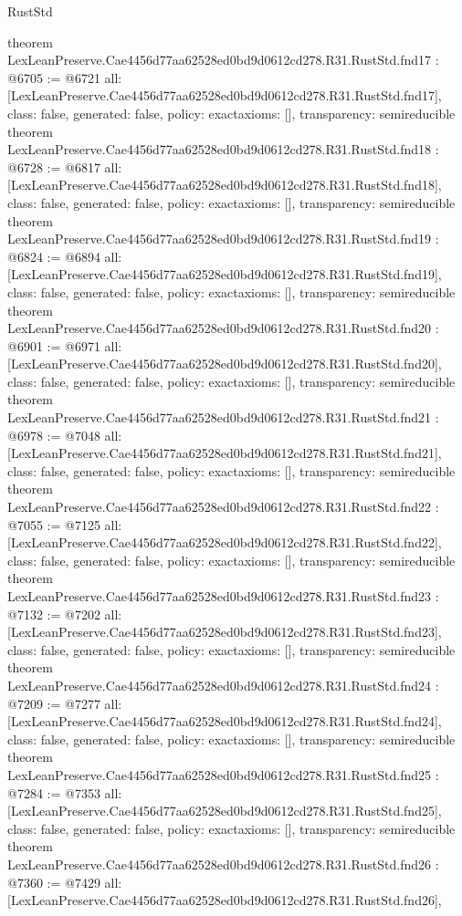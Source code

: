 \begin{lexlean}{RustStd}
\begin{coremodule}
theorem LexLeanPreserve.Cae4456d77aa62528ed0bd9d0612cd278.R31.RustStd.fnd17 : @6705 := @6721 {
  all: [LexLeanPreserve.Cae4456d77aa62528ed0bd9d0612cd278.R31.RustStd.fnd17],
  class: false,
  generated: false,
  policy: exact{axioms: []},
  transparency: semireducible
}
theorem LexLeanPreserve.Cae4456d77aa62528ed0bd9d0612cd278.R31.RustStd.fnd18 : @6728 := @6817 {
  all: [LexLeanPreserve.Cae4456d77aa62528ed0bd9d0612cd278.R31.RustStd.fnd18],
  class: false,
  generated: false,
  policy: exact{axioms: []},
  transparency: semireducible
}
theorem LexLeanPreserve.Cae4456d77aa62528ed0bd9d0612cd278.R31.RustStd.fnd19 : @6824 := @6894 {
  all: [LexLeanPreserve.Cae4456d77aa62528ed0bd9d0612cd278.R31.RustStd.fnd19],
  class: false,
  generated: false,
  policy: exact{axioms: []},
  transparency: semireducible
}
theorem LexLeanPreserve.Cae4456d77aa62528ed0bd9d0612cd278.R31.RustStd.fnd20 : @6901 := @6971 {
  all: [LexLeanPreserve.Cae4456d77aa62528ed0bd9d0612cd278.R31.RustStd.fnd20],
  class: false,
  generated: false,
  policy: exact{axioms: []},
  transparency: semireducible
}
theorem LexLeanPreserve.Cae4456d77aa62528ed0bd9d0612cd278.R31.RustStd.fnd21 : @6978 := @7048 {
  all: [LexLeanPreserve.Cae4456d77aa62528ed0bd9d0612cd278.R31.RustStd.fnd21],
  class: false,
  generated: false,
  policy: exact{axioms: []},
  transparency: semireducible
}
theorem LexLeanPreserve.Cae4456d77aa62528ed0bd9d0612cd278.R31.RustStd.fnd22 : @7055 := @7125 {
  all: [LexLeanPreserve.Cae4456d77aa62528ed0bd9d0612cd278.R31.RustStd.fnd22],
  class: false,
  generated: false,
  policy: exact{axioms: []},
  transparency: semireducible
}
theorem LexLeanPreserve.Cae4456d77aa62528ed0bd9d0612cd278.R31.RustStd.fnd23 : @7132 := @7202 {
  all: [LexLeanPreserve.Cae4456d77aa62528ed0bd9d0612cd278.R31.RustStd.fnd23],
  class: false,
  generated: false,
  policy: exact{axioms: []},
  transparency: semireducible
}
theorem LexLeanPreserve.Cae4456d77aa62528ed0bd9d0612cd278.R31.RustStd.fnd24 : @7209 := @7277 {
  all: [LexLeanPreserve.Cae4456d77aa62528ed0bd9d0612cd278.R31.RustStd.fnd24],
  class: false,
  generated: false,
  policy: exact{axioms: []},
  transparency: semireducible
}
theorem LexLeanPreserve.Cae4456d77aa62528ed0bd9d0612cd278.R31.RustStd.fnd25 : @7284 := @7353 {
  all: [LexLeanPreserve.Cae4456d77aa62528ed0bd9d0612cd278.R31.RustStd.fnd25],
  class: false,
  generated: false,
  policy: exact{axioms: []},
  transparency: semireducible
}
theorem LexLeanPreserve.Cae4456d77aa62528ed0bd9d0612cd278.R31.RustStd.fnd26 : @7360 := @7429 {
  all: [LexLeanPreserve.Cae4456d77aa62528ed0bd9d0612cd278.R31.RustStd.fnd26],
}
\end{coremodule}
\end{lexlean}
